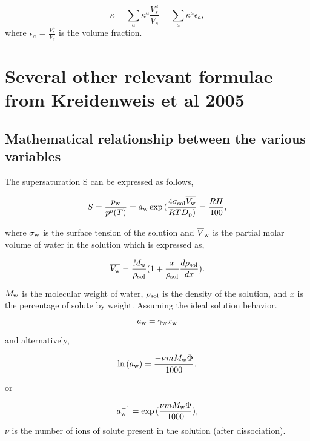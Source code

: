 \documentclass[12pt]{article}
\begin{document}
\begin{equation}\label{eqn:31}
\kappa= \sum_{a} \kappa^{a} \frac {V_{s}^{a}}{V_{s}} = \sum_{a} \kappa^{a} \epsilon_{a},
\end{equation}
where $\epsilon_{a}$ = $ \frac{V_{s}^{a}}{V_{s}}$ is the volume fraction.


\section{Several other relevant formulae from Kreidenweis et al 2005}

\subsection{Mathematical relationship between the various variables}

The supersaturation S can be expressed as follows,

\begin{equation}
S=\frac{p_{\rm w}}{p^{o}(T)}=a_{\rm w} \exp {(\frac{4 \sigma_{\rm sol} \overline{V_{\rm w}}} {RT D_{\rm p} ) } }= \frac {RH}{100},
\end{equation}

where $\sigma_{\rm w}$ is the surface tension of the solution and $\overline V_{\rm w}$ is the partial molar volume of water in the solution which is expressed as, 

\begin{equation}
\overline{V_{\rm w}}=\frac{ M_{\rm w}}{\rho_{\rm sol}} (1 + \frac{x}{\rho_{\rm sol}} \frac{d \rho_{\rm sol}}{dx}).
\end{equation}

$M_{\rm w}$ is the molecular weight of water, $\rho_{\rm sol}$ is the density of the solution, and $x$ is the percentage of solute by weight. Assuming the ideal solution behavior.

\begin{equation}
a_{\rm w}=\gamma_{\rm w} x_{\rm w}
\end{equation}

and alternatively, 

\begin{equation}
\ln {(a_{\rm w})}=\frac{- \nu m M_{\rm w} \Phi }{1000}.
\end{equation}

or 

\begin{equation}\label{eqn:46}
a_{\rm w}^{-1}=\exp{(\frac{\nu m M_{\rm w} \Phi }{1000})},
\end{equation}
$\nu$ is the number of ions of solute present in the solution (after dissociation). 
\end{document}
